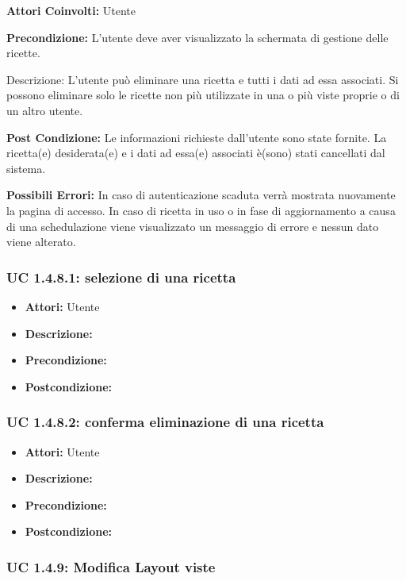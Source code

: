 \textbf{Attori Coinvolti:}
Utente

\textbf{Precondizione:}
L’utente deve aver visualizzato la schermata di gestione delle ricette.

Descrizione:
L’utente può eliminare una ricetta e tutti i dati ad essa associati.
Si possono eliminare solo le ricette non più utilizzate in una o più viste proprie o di un altro utente.    

\textbf{Post Condizione:}
Le informazioni richieste dall'utente sono state fornite.
La ricetta(e) desiderata(e) e i dati ad essa(e) associati è(sono) stati cancellati dal sistema.

\textbf{Possibili Errori:}
In caso di autenticazione scaduta verrà mostrata nuovamente la pagina di accesso.
In caso di ricetta in uso o in fase di aggiornamento a causa di una schedulazione viene visualizzato un messaggio di errore e nessun dato viene alterato.

\subsubsection{UC 1.4.8.1: selezione di una ricetta}

\begin{itemize}
\item \textbf{Attori:} Utente
\item \textbf{Descrizione:} 
\item \textbf{Precondizione:} 
\item \textbf{Postcondizione:} 
\end{itemize}

\subsubsection{UC 1.4.8.2: conferma eliminazione di una ricetta}

\begin{itemize}
\item \textbf{Attori:} Utente
\item \textbf{Descrizione:} 
\item \textbf{Precondizione:} 
\item \textbf{Postcondizione:} 
\end{itemize}

\subsubsection{UC 1.4.9: Modifica Layout viste }

